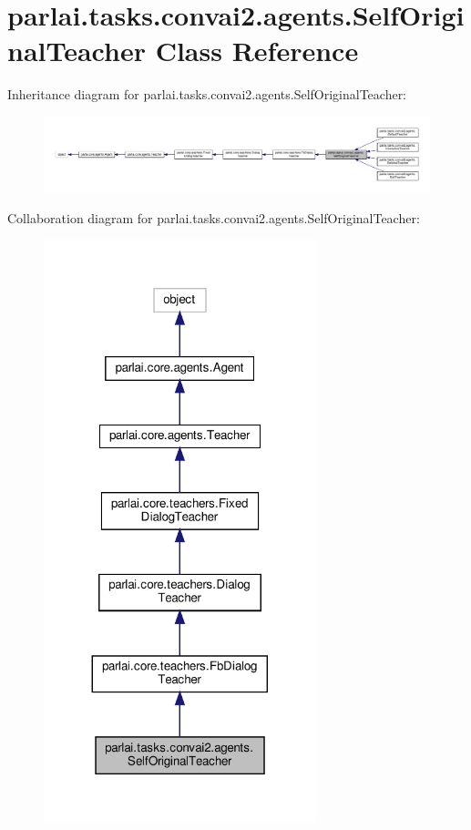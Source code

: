 \hypertarget{classparlai_1_1tasks_1_1convai2_1_1agents_1_1SelfOriginalTeacher}{}\section{parlai.\+tasks.\+convai2.\+agents.\+Self\+Original\+Teacher Class Reference}
\label{classparlai_1_1tasks_1_1convai2_1_1agents_1_1SelfOriginalTeacher}


Inheritance diagram for parlai.\+tasks.\+convai2.\+agents.\+Self\+Original\+Teacher\+:\nopagebreak
\begin{figure}[H]
\begin{center}
\leavevmode
\includegraphics[width=350pt]{d0/d6e/classparlai_1_1tasks_1_1convai2_1_1agents_1_1SelfOriginalTeacher__inherit__graph}
\end{center}
\end{figure}


Collaboration diagram for parlai.\+tasks.\+convai2.\+agents.\+Self\+Original\+Teacher\+:\nopagebreak
\begin{figure}[H]
\begin{center}
\leavevmode
\includegraphics[width=224pt]{d5/db8/classparlai_1_1tasks_1_1convai2_1_1agents_1_1SelfOriginalTeacher__coll__graph}
\end{center}
\end{figure}
